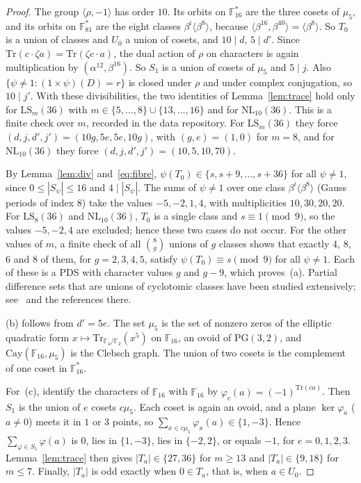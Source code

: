 \documentclass[11pt]{amsart}
\theoremstyle{definition}
\newcommand{\F}{\mathbb{F}}
\newcommand{\Cay}{\mathrm{Cay}}
\newcommand{\LS}{\mathrm{LS}}
\newcommand{\NL}{\mathrm{NL}}
\begin{document}
\begin{proof}
The group $\langle\rho,-1\rangle$ has order $10$. Its orbits on $\F_{16}^*$ are the three cosets of $\mu_5$, and its orbits on $\F_{81}^*$ are the eight classes $\beta^i\langle\beta^8\rangle$, because $\langle\beta^{16},\beta^{40}\rangle=\langle\beta^8\rangle$. So $T_0$ is a union of classes and $U_0$ a union of cosets, and $10\mid d$, $5\mid d'$. Since $\mathrm{Tr}(c\cdot\zeta a)=\mathrm{Tr}(\zeta c\cdot a)$, the dual action of $\rho$ on characters is again multiplication by $(\alpha^{12},\beta^{16})$. So $S_1$ is a union of cosets of $\mu_5$ and $5\mid j$. Also $\{\psi\ne1:(1\times\psi)(D)=r\}$ is closed under $\rho$ and under complex conjugation, so $10\mid j'$. With these divisibilities, the two identities of Lemma~\ref{lem:trace} hold only for $\LS_m(36)$ with $m\in\{5,\dots,8\}\cup\{13,\dots,16\}$ and for $\NL_{10}(36)$. This is a finite check over $m$, recorded in the data repository. For $\LS_m(36)$ they force $(d,j,d',j')=(10g,5e,5e,10g)$, with $(g,e)=(1,0)$ for $m=8$, and for $\NL_{10}(36)$ they force $(d,j,d',j')=(10,5,10,70)$.

By Lemma~\ref{lem:div} and~\eqref{eq:fibre}, $\psi(T_0)\in\{s,s+9,\dots,s+36\}$ for all $\psi\ne1$, since $0\le|S_\psi|\le16$ and $4\mid|S_\psi|$. The sums of $\psi\ne1$ over one class $\beta^i\langle\beta^8\rangle$ (Gauss periods of index $8$) take the values $-5,-2,1,4$, with multiplicities $10,30,20,20$. For $\LS_8(36)$ and $\NL_{10}(36)$, $T_0$ is a single class and $s\equiv1\pmod 9$, so the values $-5,-2,4$ are excluded; hence these two cases do not occur. For the other values of $m$, a finite check of all $\binom8g$ unions of $g$ classes shows that exactly $4$, $8$, $6$ and $8$ of them, for $g=2,3,4,5$, satisfy $\psi(T_0)\equiv s\pmod 9$ for all $\psi\ne1$. Each of these is a PDS with character values $g$ and $g-9$, which proves~(a). Partial difference sets that are unions of cyclotomic classes have been studied extensively; see~\cite{LMX2025} and the references there.

(b) follows from $d'=5e$. The set $\mu_5$ is the set of nonzero zeros of the elliptic quadratic form $x\mapsto\mathrm{Tr}_{\F_4/\F_2}(x^5)$ on $\F_{16}$, an ovoid of $\mathrm{PG}(3,2)$, and $\Cay(\F_{16},\mu_5)$ is the Clebsch graph. The union of two cosets is the complement of one coset in $\F_{16}^*$.

For~(c), identify the characters of $\F_{16}$ with $\F_{16}$ by $\varphi_c(a)=(-1)^{\mathrm{Tr}(ca)}$. Then $S_1$ is the union of $e$ cosets $c\mu_5$. Each coset is again an ovoid, and a plane $\ker\varphi_a$ ($a\ne0$) meets it in $1$ or $3$ points, so $\sum_{x\in c\mu_5}\varphi_x(a)\in\{1,-3\}$. Hence $\sum_{\varphi\in S_1}\varphi(a)$ is $0$, lies in $\{1,-3\}$, lies in $\{-2,2\}$, or equals $-1$, for $e=0,1,2,3$. Lemma~\ref{lem:trace} then gives $|T_a|\in\{27,36\}$ for $m\ge13$ and $|T_a|\in\{9,18\}$ for $m\le7$. Finally, $|T_a|$ is odd exactly when $0\in T_a$, that is, when $a\in U_0$.
\end{proof}
\end{document}
